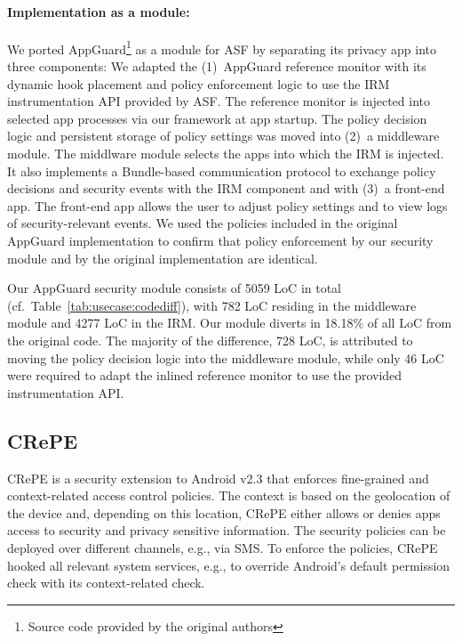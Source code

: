 \documentclass[letterpaper,twocolumn,10pt]{article}
\newcommand{\OURSHORT}{\textsc{ASF}\xspace}
\begin{document}
\paragraph{Implementation as a module:} We ported AppGuard\footnote{Source code provided by the original authors} as a module for \OURSHORT by separating its privacy app into three components:  We adapted the (1)~AppGuard reference monitor with its dynamic hook placement and policy enforcement logic to use the IRM instrumentation API provided by \OURSHORT. The reference monitor is injected into selected app processes via our framework at app startup. The policy decision logic and persistent storage of policy settings was moved into (2)~a middleware module. The middlware module selects the apps into which the IRM is injected. It also implements a Bundle-based communication protocol to exchange policy decisions and security events with the IRM component and with (3)~a front-end app. The front-end app allows the user to adjust policy settings and to view logs of security-relevant events. We used the policies included in the original AppGuard implementation to confirm that policy enforcement by our security module and by the original implementation are identical.

Our AppGuard security module consists of 5059 LoC in total (cf.~Table~\ref{tab:usecase:codediff}), with 782 LoC residing in the middleware module and 4277 LoC in the IRM. Our module diverts in 18.18\% of all LoC from the original code. The majority of the difference, 728 LoC, is attributed to moving the policy decision logic into the middleware module, while only 46 LoC were required to adapt the inlined reference monitor to use the provided instrumentation API.


\subsection{CRePE~\cite{CoNgCr_10:CRePE}}
\label{sec:usecase:crepe}

CRePE is a security extension to Android v2.3 that enforces fine-grained and context-related access control policies. The context is based on the geolocation of the device and, depending on this location, CRePE either allows or denies apps access to security and privacy sensitive information. The security policies can be deployed over different channels, e.g., via SMS. To enforce the policies, CRePE hooked all relevant system services, e.g., to override Android's default permission check with its context-related check.
\end{document}
